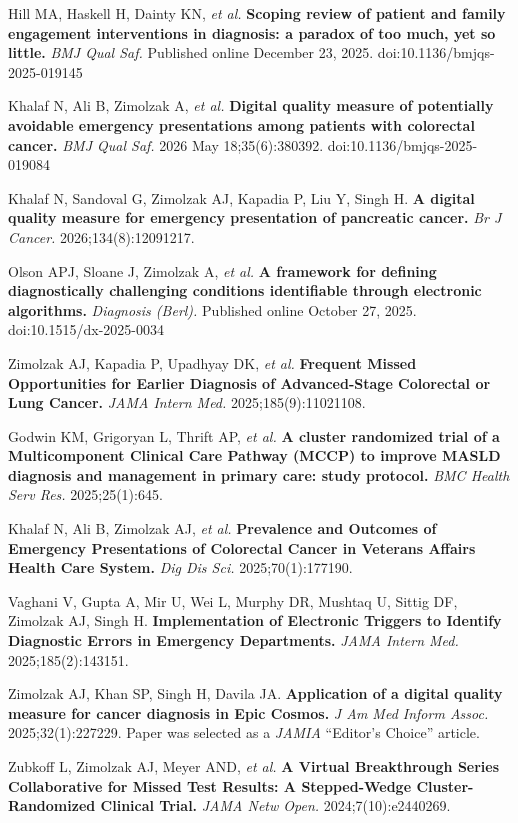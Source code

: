 \documentclass[10pt]{article}
\begin{document}
Hill MA, Haskell H, Dainty KN, \emph{et al.} \textbf{Scoping review of patient and family engagement interventions in diagnosis: a paradox of too much, yet so little.} \emph{BMJ Qual Saf.} Published online December 23, 2025. doi:10.1136/bmjqs-2025-019145 %

Khalaf N, Ali B, Zimolzak A, \emph{et al.} \textbf{Digital quality
  measure of potentially avoidable emergency presentations among
  patients with colorectal cancer.} \emph{BMJ Qual Saf.} 2026 May
18;35(6):380\ndash{}392. doi:10.1136/bmjqs-2025-019084

Khalaf N, Sandoval G, Zimolzak AJ, Kapadia P, Liu Y, Singh H.
\textbf{A digital quality measure for emergency presentation of
  pancreatic cancer.} \emph{Br J Cancer.}
2026;134(8):1209\ndash{}1217.

Olson APJ, Sloane J, Zimolzak A, \emph{et al.} \textbf{A framework for
  defining diagnostically challenging conditions identifiable through
  electronic algorithms.} \emph{Diagnosis (Berl).} Published online
October 27, 2025. doi:10.1515/dx-2025-0034

Zimolzak AJ, Kapadia P, Upadhyay DK, \emph{et al.} \textbf{Frequent
  Missed Opportunities for Earlier Diagnosis of Advanced-Stage
  Colorectal or Lung Cancer.} \emph{JAMA Intern Med.}
2025;185(9):1102\ndash{}1108.

Godwin KM, Grigoryan L, Thrift AP, \emph{et al.} \textbf{A cluster
  randomized trial of a Multicomponent Clinical Care Pathway (MCCP) to
  improve MASLD diagnosis and management in primary care: study
  protocol.} \emph{BMC Health Serv Res.} 2025;25(1):645.

Khalaf N, Ali B, Zimolzak AJ, \emph{et al.} \textbf{Prevalence and
  Outcomes of Emergency Presentations of Colorectal Cancer in Veterans
  Affairs Health Care System.} \emph{Dig Dis Sci.}
2025;70(1):177\ndash{}190.

Vaghani V, Gupta A, Mir U, Wei L, Murphy DR, Mushtaq U, Sittig DF,
Zimolzak AJ, Singh H. \textbf{Implementation of Electronic Triggers to
  Identify Diagnostic Errors in Emergency Departments.} \emph{JAMA
Intern Med.} 2025;185(2):143\ndash{}151.

Zimolzak AJ, Khan SP, Singh H, Davila JA. \textbf{Application of a
  digital quality measure for cancer diagnosis in Epic Cosmos.}
\emph{J Am Med Inform Assoc.} 2025;32(1):227\ndash{}229. Paper was
selected as a \emph{JAMIA} ``Editor's Choice'' article.

Zubkoff L, Zimolzak AJ, Meyer AND, \emph{et al.} \textbf{A Virtual
  Breakthrough Series Collaborative for Missed Test Results: A
  Stepped-Wedge Cluster-Randomized Clinical Trial.} \emph{JAMA Netw
Open.} 2024;7(10):e2440269.
\end{document}

